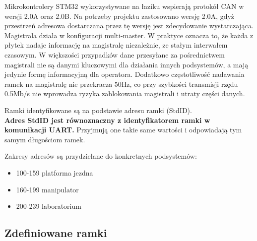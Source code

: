 \documentclass{article}
\begin{document}
Mikrokontrolery STM32 wykorzystywane na łaziku wspierają protokół CAN w wersji 2.0A oraz 2.0B. Na potrzeby projektu zastosowano wersję 2.0A, gdyż przestrzeń adresowa dostarczana przez tę wersję jest zdecydowanie wystarczająca. Magistrala działa w konfiguracji multi-master. W praktyce oznacza to, że każda z płytek nadaje informację na magistralę niezależnie, ze stałym interwałem czasowym. W większości przypadków dane przesyłane za pośrednictwem magistrali nie są danymi kluczowymi dla działania innych podsystemów, a mają jedynie formę informacyjną dla operatora. Dodatkowo częstotliwość nadawania ramek na magistralę nie przekracza 50Hz, co przy szybkości transmisji rzędu 0.5Mb/s nie wprowadza ryzyka zablokowania magistrali i utraty części danych.

Ramki identyfikowane są na podstawie adresu ramki (StdID). \\
\textbf{Adres StdID jest równoznaczny z identyfikatorem ramki w komunikacji UART.} Przyjmują one takie same wartości i odpowiadają tym samym długościom ramek. 

Zakresy adresów są przydzielane do konkretnych podsystemów:
\begin{itemize}
\item 100-159 platforma jezdna
\item 160-199 manipulator
\item 200-239 laboratorium
\end{itemize}

\subsection{Zdefiniowane ramki}
\end{document}
